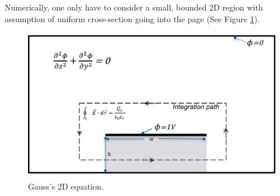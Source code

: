 \documentclass[11pt,final]{scrbook}
\begin{document}
Numerically, one only have to consider a small, bounded 2D region with assumption of uniform cross-section going into the page (See Figure \ref{fig:Gauss2D}). 

\begin{figure}[htbp]
\begin{center}
\includegraphics[scale=0.5]{images/Gauss2D.pdf}
\caption{Gauss's 2D equation.}
\label{fig:Gauss2D}
\end{center}
\end{figure}
\end{document}
